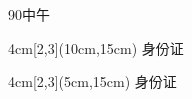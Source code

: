\documentclass[11pt,a4paper]{article}
\begin{document}
	90中午
	
	
\begin{textblock*}{4cm}[2,3](10cm,15cm)
身份证
\end{textblock*}

\begin{textblock*}{4cm}[2,3](5cm,15cm)
	身份证
\end{textblock*}
\end{document}
